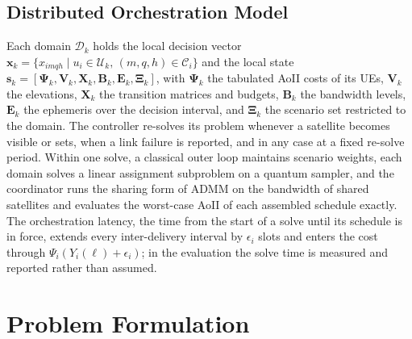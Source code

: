 \subsection{Distributed Orchestration Model}

Each domain $\mathcal{D}_k$ holds the local decision vector $\mathbf{x}_k=\{x_{imqh}\mid u_i\in\mathscr{U}_k,\,
(m,q,h)\in\mathscr{C}_i\}$ and the local state $\mathbf{s}_k=[\boldsymbol{\Psi}_k,\mathbf{V}_k,\mathbf{X}_k,
\mathbf{B}_k,\mathbf{E}_k,\boldsymbol{\Xi}_k]$, with $\boldsymbol{\Psi}_k$ the tabulated AoII costs of its UEs,
$\mathbf{V}_k$ the elevations, $\mathbf{X}_k$ the transition matrices and budgets, $\mathbf{B}_k$ the bandwidth levels,
$\mathbf{E}_k$ the ephemeris over the decision interval, and $\boldsymbol{\Xi}_k$ the scenario set restricted to the
domain. The controller re-solves its problem whenever a satellite becomes visible or sets, when a link failure is
reported, and in any case at a fixed re-solve period. Within one solve, a classical outer loop maintains scenario
weights, each domain solves a linear assignment subproblem on a quantum sampler, and the coordinator runs the sharing
form of ADMM on the bandwidth of shared satellites and evaluates the worst-case AoII of each assembled schedule
exactly. The orchestration latency, the time from the start of a solve until its schedule is in force, extends every
inter-delivery interval by $\epsilon_i$ slots and enters the cost through $\Psi_i(Y_i(\ell)+\epsilon_i)$; in the
evaluation the solve time is measured and reported rather than assumed.

\section{Problem Formulation}

